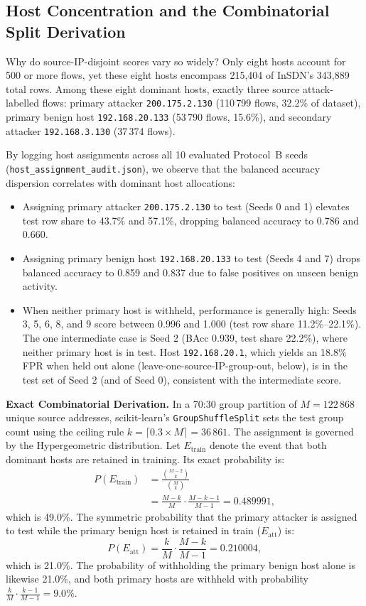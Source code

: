 \documentclass[journal]{IEEEtran}
\begin{document}
\subsection{Host Concentration and the Combinatorial Split Derivation}
Why do source-IP-disjoint scores vary so widely? Only eight hosts account for 500 or more flows, yet these eight hosts encompass 215,404 of InSDN's 343,889 total rows. Among these eight dominant hosts, exactly three source attack-labelled flows: primary attacker \texttt{200.175.2.130} (110\,799 flows, 32.2\% of dataset), primary benign host \texttt{192.168.20.133} (53\,790 flows, 15.6\%), and secondary attacker \texttt{192.168.3.130} (37\,374 flows).

By logging host assignments across all 10 evaluated Protocol~B seeds (\texttt{host\_assignment\_audit.json}), we observe that the balanced accuracy dispersion correlates with dominant host allocations:
\begin{itemize}
    \item Assigning primary attacker \texttt{200.175.2.130} to test (Seeds 0 and 1) elevates test row share to 43.7\% and 57.1\%, dropping balanced accuracy to 0.786 and 0.660.
    \item Assigning primary benign host \texttt{192.168.20.133} to test (Seeds 4 and 7) drops balanced accuracy to 0.859 and 0.837 due to false positives on unseen benign activity.
    \item When neither primary host is withheld, performance is generally high: Seeds 3, 5, 6, 8, and 9 score between 0.996 and 1.000 (test row share 11.2\%--22.1\%). The one intermediate case is Seed 2 (BAcc 0.939, test share 22.2\%), where neither primary host is in test. Host \texttt{192.168.20.1}, which yields an 18.8\% FPR when held out alone (leave-one-source-IP-group-out, below), is in the test set of Seed 2 (and of Seed 0), consistent with the intermediate score.
\end{itemize}

\textbf{Exact Combinatorial Derivation.} In a 70:30 group partition of $M=122\,868$ unique source addresses, scikit-learn's \texttt{GroupShuffleSplit} sets the test group count using the ceiling rule $k = \lceil 0.3 \times M \rceil = 36\,861$. The assignment is governed by the Hypergeometric distribution. Let $E_{\text{train}}$ denote the event that both dominant hosts are retained in training. Its exact probability is:
\begin{align}
P(E_{\text{train}}) &= \frac{\binom{M-2}{k}}{\binom{M}{k}} \nonumber \\
&= \frac{M-k}{M} \cdot \frac{M-k-1}{M-1} = 0.489991,
\end{align}
which is 49.0\%. The symmetric probability that the primary attacker is assigned to test while the primary benign host is retained in train ($E_{\text{att}}$) is:
\begin{equation}
P(E_{\text{att}}) = \frac{k}{M} \cdot \frac{M-k}{M-1} = 0.210004,
\end{equation}
which is 21.0\%. The probability of withholding the primary benign host alone is likewise 21.0\%, and both primary hosts are withheld with probability $\frac{k}{M} \cdot \frac{k-1}{M-1} = 9.0\%$.
\end{document}
